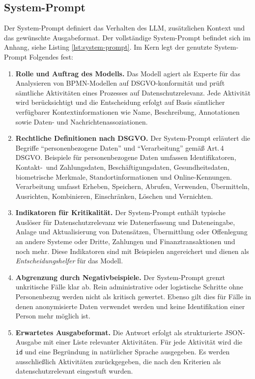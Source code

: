 \subsection*{System-Prompt}

Der System-Prompt definiert das Verhalten des \ac{LLM}, zusätzlichen Kontext und das gewünschte Ausgabeformat. Der vollständige System-Prompt befindet sich im Anhang, siehe Listing \ref{lst:system-prompt}. Im Kern legt der genutzte System-Prompt Folgendes fest:

\begin{enumerate}
    \item \textbf{Rolle und Auftrag des Modells.} Das Modell agiert als Experte für das Analysieren von \ac{BPMN}-Modellen auf \ac{DSGVO}-konformität und prüft sämtliche Aktivitäten eines Prozesses auf Datenschutzrelevanz. Jede Aktivität wird berücksichtigt und die Entscheidung erfolgt auf Basis sämtlicher verfügbarer Kontextinformationen wie Name, Beschreibung, Annotationen sowie Daten- und Nachrichtenassoziationen.
    \item \textbf{Rechtliche Definitionen nach \ac{DSGVO}.} Der System-Prompt erläutert die Begriffe \enquote{personenbezogene Daten} und \enquote{Verarbeitung} gemäß Art.\,4 \ac{DSGVO}. Beispiele für personenbezogene Daten umfassen Identifikatoren, Kontakt-\linebreak~und Zahlungsdaten, Beschäftigungsdaten, Gesundheitsdaten, biometrische Merkmale, Standortinformationen und Online-Kennungen. Verarbeitung umfasst Erheben, Speichern, Abrufen, Verwenden, Übermitteln, Ausrichten, Kombinieren, Einschränken, Löschen und Vernichten.
    \item \textbf{Indikatoren für Kritikalität.} Der System-Prompt enthält typische Auslöser für Datenschutzrelevanz wie Datenerfassung und Dateneingabe, Anlage und Aktualisierung von Datensätzen, Übermittlung oder Offenlegung an andere Systeme oder Dritte, Zahlungen und Finanztransaktionen und noch mehr. Diese Indikatoren sind mit Beispielen angereichert und dienen als \emph{Entscheidungshelfer} für das Modell.
    \item \textbf{Abgrenzung durch Negativbeispiele.} Der System-Prompt grenzt unkritische Fälle klar ab. Rein administrative oder logistische Schritte ohne Personenbezug werden nicht als kritisch gewertet. Ebenso gilt dies für Fälle in denen anonymisierte Daten verwendet werden und keine Identifikation einer Person mehr möglich ist.
    \item \textbf{Erwartetes Ausgabeformat.} Die Antwort erfolgt als strukturierte JSON-\hspace{0pt}Ausgabe mit einer Liste relevanter Aktivitäten. Für jede Aktivität wird die \texttt{id} und eine Begründung in natürlicher Sprache ausgegeben. Es werden ausschließlich Aktivitäten zurückgegeben, die nach den Kriterien als datenschutzrelevant eingestuft wurden.
\end{enumerate}


